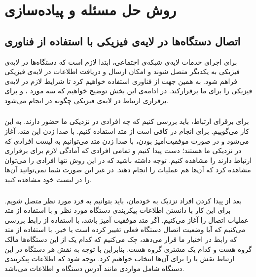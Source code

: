 \chapter{روش حل مسئله و پیاده‌سازی}
\thispagestyle{empty}
\section{اتصال دستگاه‌ها  در لایه‌ی فیزیکی با استفاده از فناوری }

برای اجرای خدمات لایه‌ی شبکه‌ی اجتماعی، ابتدا لازم است که دستگاه‌ها در لایه‌ی فیزیکی به یکدیگر متصل شوند و امکان ارسال و دریافت اطلاعات در لایه‌ی فیزیکی فراهم شود. به همین جهت از فناوری 
استفاده خواهیم کرد تا شرایط لازم در لایه‌ی فیزیکی را برای ما برقرار‌کند. در ادامه‌ی این بخش توضیح خواهیم که سه مورد 
،
و
برای برقراری ارتباط در لایه‌ی فیزیکی چگونه در
 انجام می‌شود.
\subsection{}
 برای برقرای ارتباط، باید بررسی کنیم که چه افرادی در نزدیکی ما حضور دارند. به این کار
  می‌گوییم. برای انجام 
در 
کافی است از متد
استفاده کنیم. با صدا زدن این متد،
آغاز می‌شود و در صورت موفقیت‌آمیز بودن، با صدا زدن متد
می‌توانیم به لیست افرادی که در نزدیکی ما هستند؛ دست پیدا کنیم و تمامی افرادی که آمادگی لازم برای برقراری ارتباط دارند را مشاهده کنیم. توجه داشته باشید که در این روش تنها افرادی را می‌توان مشاهده کرد که آن‌ها هم عملیات 
را انجام دهند. در غیر این صورت شما نمی‌توانید آن‌ها را در لیست خود مشاهده کنید.
\subsection{}
بعد از پیدا کردن افراد نزدیک به خودمان، باید بتوانیم به فرد مورد نظر متصل شویم. برای این کار با دانستن اطلاعات پیکربندی دستگاه مورد نظر و با استفاده از متد 
عملیات اتصال را آغاز می‌کنیم. اگر متد 
موفقیت آمیز باشد، با استفاده از رابط 
بررسی می‌کنیم که آیا وضعیت اتصال دستگاه فعلی تغییر کرده است یا خیر. با استفاده از متد 
که رابط 
 در اختیار ما قرار می‌دهد، چک می‌کنیم که کدام یک از این دستگاه‌ها مالک گروه هست و کدام یک مشتری گروه هست. بنابراین با توجه به نقش هر دستگاه در این ارتباط نقش  
یا 
را برای آن‌ها انتخاب خواهیم کرد.
توجه شود که اطلاعات پیکربندی دستگاه شامل مواردی مانند آدرس 
دستگاه و اطلاعات 
می‌باشد.
